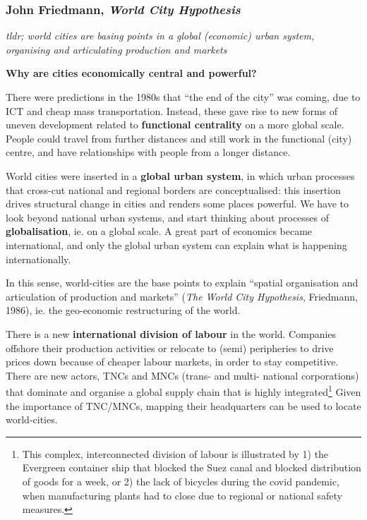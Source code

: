 \documentclass{article}
\begin{document}
\subsubsection{John Friedmann, \textit{World City Hypothesis}}

\textit{tldr; world cities are basing points in a global (economic) urban system, organising and articulating production and markets}

\textbf{Why are cities economically central and powerful?}

There were predictions in the 1980s that ``the end of the city'' was coming, due to ICT and cheap mass transportation. Instead, these gave rise to new forms of uneven development related to \textbf{functional centrality} on a more global scale. People could travel from further distances and still work in the functional (city) centre, and have relationships with people from a longer distance.

World cities were inserted in a \textbf{global urban system}, in which urban processes that cross-cut national and regional borders are conceptualised: this insertion drives structural change in cities and renders some places powerful. We have to look beyond national urban systems, and start thinking about processes of \textbf{globalisation}, ie. on a global scale. A great part of economics became international, and only the global urban system can explain what is happening internationally. 

In this sense, world-cities are the base points to explain ``spatial organisation and articulation of production and markets'' (\textit{The World City Hypothesis}, Friedmann, 1986), ie. the geo-economic restructuring of the world.

There is a new \textbf{international division of labour} in the world. Companies offshore their production activities or relocate to (semi) peripheries to drive prices down because of cheaper labour markets, in order to stay competitive. There are new actors, TNCs and MNCs (trans- and multi- national corporations) that dominate and organise a global supply chain that is highly integrated\footnote{This complex, interconnected division of labour is illustrated by 1) the Evergreen container ship that blocked the Suez canal and blocked distribution of goods for a week, or 2) the lack of bicycles during the covid pandemic, when manufacturing plants had to close due to regional or national safety measures.} Given the importance of TNC/MNCs, mapping their headquarters can be used to locate world-cities. 
\end{document}

